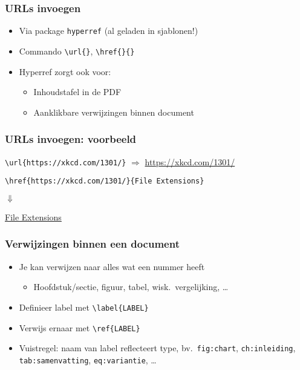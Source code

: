 \documentclass[aspectratio=169]{beamer}
\begin{document}
\begin{frame}[fragile]
  \frametitle{URLs invoegen}

  \begin{itemize}
    \item Via package \texttt{hyperref} (al geladen in sjablonen!)
    \item Commando \verb+\url{}+, \verb+\href{}{}+
    \item Hyperref zorgt ook voor:
          \begin{itemize}
            \item Inhoudstafel in de PDF
            \item Aanklikbare verwijzingen binnen document
          \end{itemize}
  \end{itemize}

\end{frame}

\begin{frame}[fragile]
  \frametitle{URLs invoegen: voorbeeld}

  \verb+\url{https://xkcd.com/1301/}+ $\Rightarrow$ \url{https://xkcd.com/1301/}

  \bigskip

  \verb+\href{https://xkcd.com/1301/}{File Extensions}+

  $\Downarrow$

  \href{https://xkcd.com/1301/}{File Extensions}

\end{frame}

\begin{frame}[fragile]
  \frametitle{Verwijzingen binnen een document}

  \begin{itemize}
    \item Je kan verwijzen naar alles wat een nummer heeft
          \begin{itemize}
            \item Hoofdstuk/sectie, figuur, tabel, wisk.~vergelijking, \ldots
          \end{itemize}
    \item Definieer label met \verb+\label{LABEL}+
    \item Verwijs ernaar met \verb+\ref{LABEL}+
    \item Vuistregel: naam van label reflecteert type, bv.~\texttt{fig:chart}, \texttt{ch:inleiding}, \texttt{tab:samenvatting}, \texttt{eq:variantie}, \ldots
  \end{itemize}

\end{frame}
\end{document}
